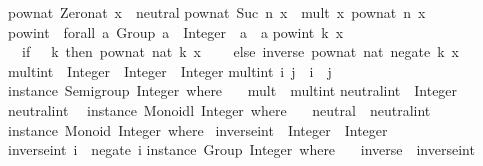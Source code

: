 \begin{isabellebody}
\begin{isamarkuptext}
pow{\isacharunderscore}nat\ Zero{\isacharunderscore}nat\ x\ {\isacharequal}\ neutral{\isacharsemicolon}\isanewline
pow{\isacharunderscore}nat\ {\isacharparenleft}Suc\ n{\isacharparenright}\ x\ {\isacharequal}\ mult\ x\ {\isacharparenleft}pow{\isacharunderscore}nat\ n\ x{\isacharparenright}{\isacharsemicolon}\isanewline
\isanewline
pow{\isacharunderscore}int\ {\isacharcolon}{\isacharcolon}\ forall\ a{\isachardot}\ {\isacharparenleft}Group\ a{\isacharparenright}\ {\isacharequal}{\isachargreater}\ Integer\ {\isacharminus}{\isachargreater}\ a\ {\isacharminus}{\isachargreater}\ a{\isacharsemicolon}\isanewline
pow{\isacharunderscore}int\ k\ x\ {\isacharequal}\isanewline
\ \ {\isacharparenleft}if\ {}\ {\isacharless}{\isacharequal}\ k\ then\ pow{\isacharunderscore}nat\ {\isacharparenleft}nat\ k{\isacharparenright}\ x\isanewline
\ \ \ \ else\ inverse\ {\isacharparenleft}pow{\isacharunderscore}nat\ {\isacharparenleft}nat\ {\isacharparenleft}negate\ k{\isacharparenright}{\isacharparenright}\ x{\isacharparenright}{\isacharparenright}{\isacharsemicolon}\isanewline
\isanewline
mult{\isacharunderscore}int\ {\isacharcolon}{\isacharcolon}\ Integer\ {\isacharminus}{\isachargreater}\ Integer\ {\isacharminus}{\isachargreater}\ Integer{\isacharsemicolon}\isanewline
mult{\isacharunderscore}int\ i\ j\ {\isacharequal}\ i\ {\isacharplus}\ j{\isacharsemicolon}\isanewline
\isanewline
instance\ Semigroup\ Integer\ where\ {\isacharbraceleft}\isanewline
\ \ mult\ {\isacharequal}\ mult{\isacharunderscore}int{\isacharsemicolon}\isanewline
{\isacharbraceright}{\isacharsemicolon}\isanewline
\isanewline
neutral{\isacharunderscore}int\ {\isacharcolon}{\isacharcolon}\ Integer{\isacharsemicolon}\isanewline
neutral{\isacharunderscore}int\ {\isacharequal}\ {}{\isacharsemicolon}\isanewline
\isanewline
instance\ Monoidl\ Integer\ where\ {\isacharbraceleft}\isanewline
\ \ neutral\ {\isacharequal}\ neutral{\isacharunderscore}int{\isacharsemicolon}\isanewline
{\isacharbraceright}{\isacharsemicolon}\isanewline
\isanewline
instance\ Monoid\ Integer\ where\ {\isacharbraceleft}\isanewline
{\isacharbraceright}{\isacharsemicolon}\isanewline
\isanewline
inverse{\isacharunderscore}int\ {\isacharcolon}{\isacharcolon}\ Integer\ {\isacharminus}{\isachargreater}\ Integer{\isacharsemicolon}\isanewline
inverse{\isacharunderscore}int\ i\ {\isacharequal}\ negate\ i{\isacharsemicolon}\isanewline
\isanewline
instance\ Group\ Integer\ where\ {\isacharbraceleft}\isanewline
\ \ inverse\ {\isacharequal}\ inverse{\isacharunderscore}int{\isacharsemicolon}\isanewline
{\isacharbraceright}{\isacharsemicolon}\isanewline

\end{isamarkuptext}
\end{isabellebody}
